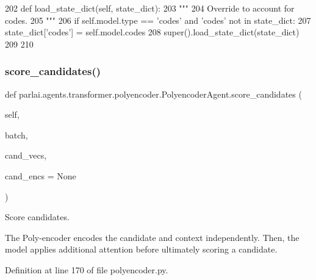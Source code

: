 \begin{DoxyCode}
202     \textcolor{keyword}{def }load\_state\_dict(self, state\_dict):
203         \textcolor{stringliteral}{"""}
204 \textcolor{stringliteral}{        Override to account for codes.}
205 \textcolor{stringliteral}{        """}
206         \textcolor{keywordflow}{if} self.model.type == \textcolor{stringliteral}{'codes'} \textcolor{keywordflow}{and} \textcolor{stringliteral}{'codes'} \textcolor{keywordflow}{not} \textcolor{keywordflow}{in} state\_dict:
207             state\_dict[\textcolor{stringliteral}{'codes'}] = self.model.codes
208         super().load\_state\_dict(state\_dict)
209 
210 
\end{DoxyCode}
\mbox{\label{classparlai_1_1agents_1_1transformer_1_1polyencoder_1_1PolyencoderAgent_ad75794f4004267ab538258bc2571235f}} 
\subsubsection{\texorpdfstring{score\+\_\+candidates()}{score\_candidates()}}
{\footnotesize\ttfamily def parlai.\+agents.\+transformer.\+polyencoder.\+Polyencoder\+Agent.\+score\+\_\+candidates (\begin{DoxyParamCaption}\item[{}]{self,  }\item[{}]{batch,  }\item[{}]{cand\+\_\+vecs,  }\item[{}]{cand\+\_\+encs = {\ttfamily None} }\end{DoxyParamCaption})}

\begin{DoxyVerb}Score candidates.

The Poly-encoder encodes the candidate and context independently. Then, the
model applies additional attention before ultimately scoring a candidate.
\end{DoxyVerb}
 

Definition at line 170 of file polyencoder.\+py.


